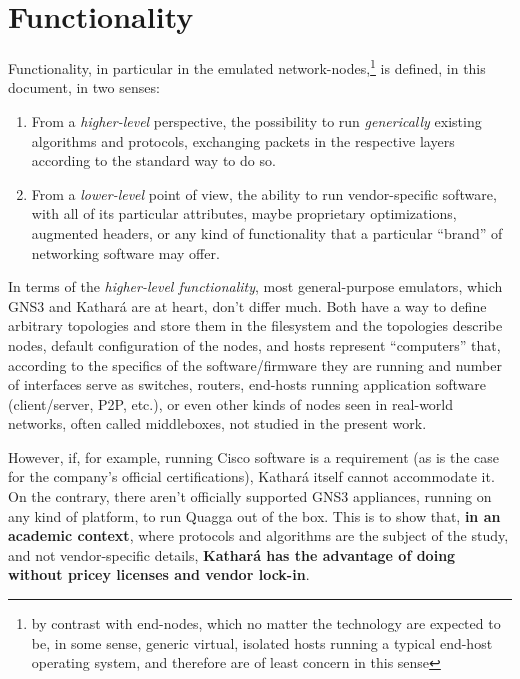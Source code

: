 \section{Functionality}
\label{sec:comparativefunctionality}

Functionality, in particular in the emulated network-nodes,\footnote{by contrast with end-nodes, which no matter the technology are expected to be, in some sense, generic virtual, isolated hosts running a typical end-host operating system, and therefore are of least concern in this sense} is defined, in this document, in two senses:
\begin{enumerate}
  \item From a \emph{higher-level} perspective, the possibility to run \emph{generically} existing algorithms and protocols, exchanging packets in the respective layers according to the standard way to do so.
  \item From a \emph{lower-level} point of view, the ability to run vendor-specific software, with all of its particular attributes, maybe proprietary optimizations, augmented headers, or any kind of functionality that a particular ``brand'' of networking software may offer.
\end{enumerate}

In terms of the \emph{higher-level functionality}, most general-purpose emulators, which GNS3 and Kathará are at heart, don't differ much.
Both have a way to define arbitrary topologies and store them in the filesystem and the topologies describe nodes, default configuration of the nodes, and hosts represent ``computers'' that, according to the specifics of the software/firmware they are running and number of interfaces serve as switches, routers, end-hosts running application software (client/server, P2P, etc.), or even other kinds of nodes seen in real-world networks, often called middleboxes, not studied in the present work.

However, if, for example, running Cisco software is a requirement (as is the case for the company's official certifications), Kathará itself cannot accommodate it.
On the contrary, there aren't officially supported GNS3 appliances, running on any kind of platform, to run Quagga out of the box.
This is to show that, \textbf{in an academic context}, where protocols and algorithms are the subject of the study, and not vendor-specific details, \textbf{Kathará has the advantage of doing without pricey licenses and vendor lock-in}.

